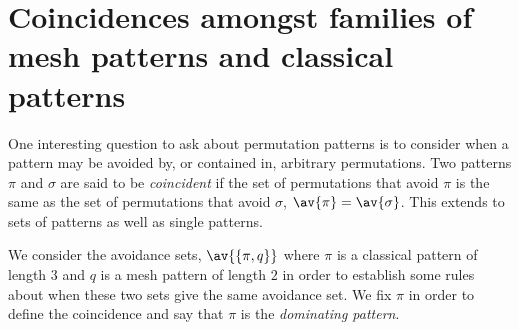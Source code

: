 \chapter[Coincidence Classification]{Coincidences amongst families of mesh patterns and classical patterns}\label{chap:coincs}
One interesting question to ask about permutation patterns is to consider when a
pattern may be avoided by, or contained in, arbitrary permutations. Two
patterns \(\pi\) and \(\sigma\) are said to be \emph{coincident} if the set
of permutations that avoid \(\pi\) is the same as the set of permutations that
avoid \(\sigma\), \ie \(\av{\pi} = \av{\sigma}\). This extends to sets of patterns as well as single patterns.

We consider the avoidance sets, \(\av{\{\pi,q\}}\) where \(\pi\) is a classical pattern
of length \(3\) and \(q\) is a mesh pattern of length \(2\) in order to
establish some rules about when these two sets give the same avoidance set.
We fix \(\pi\) in order to define the  coincidence and say that \(\pi\) is the
\emph{dominating pattern}.

